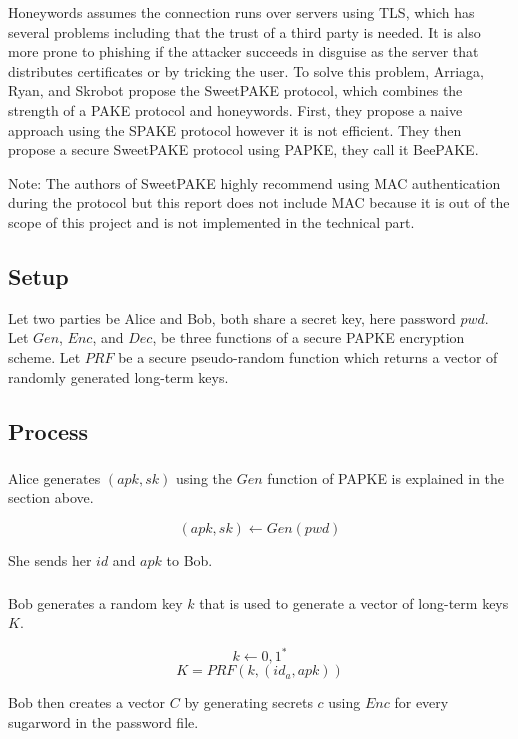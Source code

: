 \documentclass[../main.tex]{subfiles}
\begin{document}
Honeywords assumes the connection runs over servers using TLS, which has several
problems including that the trust of a third party is needed. It is also more
prone to phishing if the attacker succeeds in disguise as the server that
distributes certificates or by tricking the user. To solve this problem,
Arriaga, Ryan, and Skrobot \cite{marjan2023} propose the SweetPAKE protocol, which
combines the strength of a PAKE protocol and honeywords. First, they propose a
naive approach using the SPAKE protocol however it is not efficient. They then
propose a secure SweetPAKE protocol using PAPKE, they call it BeePAKE. 

Note: The authors of SweetPAKE highly recommend using MAC authentication during
the protocol but this report does not include MAC because it is out of the scope of
this project and is not implemented in the technical part.

\subsection{Setup} Let two parties be Alice and Bob, both share a secret key,
here password \(pwd\). Let \(Gen\),  \(Enc\), and \(Dec\), be three functions
of a secure PAPKE encryption scheme. Let \(PRF\) be a secure pseudo-random
function which returns a vector of randomly generated long-term keys.

\subsection{Process}
\subsubsection{} Alice generates \((apk, sk)\) using the \(Gen\) function of
PAPKE is explained in the section above.

\[(apk, sk) \leftarrow Gen(pwd)\]

She sends her \(id\) and \(apk\) to Bob.

\subsubsection{} Bob generates a random key \(k\) that is used to generate a 
vector of long-term keys \(K\).

\[k \leftarrow {0,1}^*\]
\[K = PRF(k, (id_a, apk))\]

Bob then creates a vector \(C\) by generating secrets \(c\) using \(Enc\) for 
every sugarword in the password file.
\end{document}
